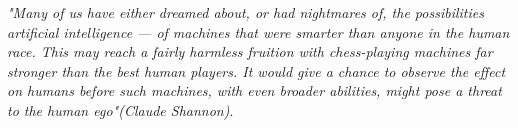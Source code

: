 \begin{titlepage}

\nonumber
\null {}
	\begin{flushright}
\textit{"Many of us have either dreamed about, or had nightmares of, the possibilities artificial intelligence — of machines that were smarter than anyone in the human race. This may reach a fairly harmless fruition with chess-playing machines far stronger than the best human players. It would give a chance to observe the effect on humans before such machines, with even broader abilities, might pose a threat to the human ego"(Claude Shannon)}. \\[5mm]
	\end{flushright}

\end{titlepage}